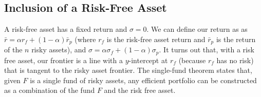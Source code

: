 \documentclass[11pt]{article}
\theoremstyle{definition}
\begin{document}
\subsection{Inclusion of a Risk-Free Asset}

A risk-free asset has a fixed return and $\sigma = 0$. We can define our return as as $\bar{r} = \alpha r_f + (1-\alpha) \bar{r}_p$ (where $r_f$ is the risk-free asset return and $\bar{r}_p$ is the return of the $n$ risky assets), and $\sigma = \alpha \sigma_f + (1-\alpha) \sigma_p$. It turns out that, with a risk free asset, our frontier is a line with a $y$-intercept at $r_f$ (because $r_f$ has no risk) that is tangent to the risky asset frontier. The single-fund theorem states that, given $F$ is a single fund of risky assets, any efficient portfolio can be constructed as a combination of the fund $F$ and the risk free asset. 

\newpage
\end{document}
